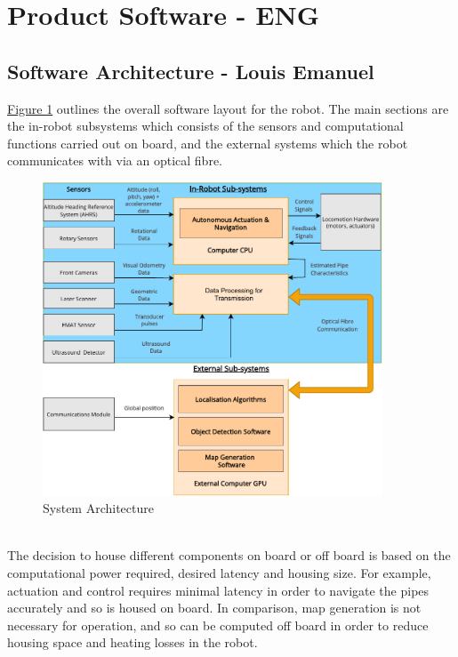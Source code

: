 \documentclass[11pt]{article}		%
\newcommand{\figref}[1]{\hyperref[#1]{Figure \ref*{#1}}}    %
\begin{document}
	\section{Product Software - ENG}
		\subsection[Software Architecture] {Software Architecture - Louis Emanuel}
 
            \figref{overalls} outlines the overall software layout for the robot. The main sections are the in-robot subsystems which consists of the sensors and computational functions carried out on board, and the external systems which the robot communicates with via an optical fibre.
    		\begin{figure}[h]
				\centering
				\includegraphics[width = 0.9\textwidth]{subsystemss}
				\caption{System Architecture}
				\label{overalls}
			\end{figure}
			\\
	        \hspace*{2ex}The decision to house different components on board or off board is based on the computational power required, desired latency and housing size. For example, actuation and control requires minimal latency in order to navigate the pipes accurately and so is housed on board. In comparison, map generation is not necessary for operation, and so can be computed off board in order to reduce housing space and heating losses in the robot.
	        \\
\end{document}
